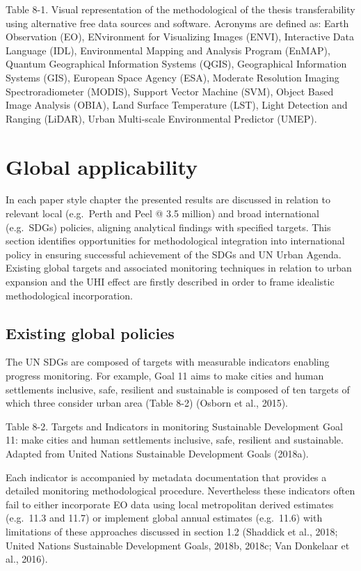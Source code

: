\documentclass[]{book}
\begin{document}
Table 8-1. Visual representation of the methodological of the thesis
transferability using alternative free data sources and software.
Acronyms are defined as: Earth Observation (EO), ENvironment for
Visualizing Images (ENVI), Interactive Data Language (IDL),
Environmental Mapping and Analysis Program (EnMAP), Quantum Geographical
Information Systems (QGIS), Geographical Information Systems (GIS),
European Space Agency (ESA), Moderate Resolution Imaging
Spectroradiometer (MODIS), Support Vector Machine (SVM), Object Based
Image Analysis (OBIA), Land Surface Temperature (LST), Light Detection
and Ranging (LiDAR), Urban Multi-scale Environmental Predictor (UMEP).

\section{Global applicability}\label{global-applicability}

In each paper style chapter the presented results are discussed in
relation to relevant local (e.g.~Perth and Peel @ 3.5 million) and broad
international (e.g.~SDGs) policies, aligning analytical findings with
specified targets. This section identifies opportunities for
methodological integration into international policy in ensuring
successful achievement of the SDGs and UN Urban Agenda. Existing global
targets and associated monitoring techniques in relation to urban
expansion and the UHI effect are firstly described in order to frame
idealistic methodological incorporation.

\subsection{Existing global policies}\label{existing-global-policies}

The UN SDGs are composed of targets with measurable indicators enabling
progress monitoring. For example, Goal 11 aims to make cities and human
settlements inclusive, safe, resilient and sustainable is composed of
ten targets of which three consider urban area (Table 8-2) (Osborn et
al., 2015).

Table 8-2. Targets and Indicators in monitoring Sustainable Development
Goal 11: make cities and human settlements inclusive, safe, resilient
and sustainable. Adapted from United Nations Sustainable Development
Goals (2018a).

Each indicator is accompanied by metadata documentation that provides a
detailed monitoring methodological procedure. Nevertheless these
indicators often fail to either incorporate EO data using local
metropolitan derived estimates (e.g.~11.3 and 11.7) or implement global
annual estimates (e.g.~11.6) with limitations of these approaches
discussed in section 1.2 (Shaddick et al., 2018; United Nations
Sustainable Development Goals, 2018b, 2018c; Van Donkelaar et al.,
2016).
\end{document}
